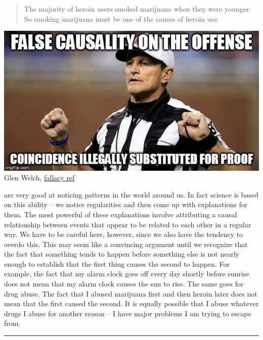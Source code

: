 \documentclass[justified]{tufte-book}
\newenvironment{argument}{\begin{quote}\normalsize}{\end{quote}}
\begin{document}
\begin{argument}
The majority of heroin users smoked marijuana when they were younger.\\
So smoking marijuana must be one of the causes of heroin use.
\end{argument}

\begin{marginfigure}
\includegraphics{img/fallacies/false-cause.jpg}\\
Glen Welch, \href{https://twitter.com/fallacy_ref?lang=en}{fallacy ref}
\end{marginfigure}

 are very good at noticing patterns in the world around us. In fact science is based on this ability -- we notice regularities and then come up with explanations for them. The most powerful of these explanations involve attributing a causal relationship between events that appear to be related to each other in a regular way. We have to be careful here, however, since we also have the tendency to overdo this. This may seem like a convincing argument until we recognize that the fact that something tends to happen before something else is not nearly enough to establish that the first thing causes the second to happen. For example, the fact that my alarm clock goes off every day shortly before sunrise does not mean that my alarm clock causes the sun to rise. The same goes for drug abuse. The fact that I abused marijuana first and then heroin later does not mean that the first caused the second. It is equally possible that I abuse whatever drugs I abuse for another reason -- I have major problems I am trying to escape from.

\begin{center}\rule{0.5\linewidth}{\linethickness}\end{center}
\end{document}
